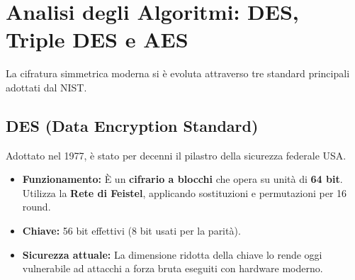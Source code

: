 \begin{figure}[h]
\end{figure}

\newpage

\section{Analisi degli Algoritmi: DES, Triple DES e AES}
La cifratura simmetrica moderna si è evoluta attraverso tre standard principali adottati dal NIST.

\subsection{DES (Data Encryption Standard)}
Adottato nel 1977, è stato per decenni il pilastro della sicurezza federale USA.
\begin{itemize}
    \item \textbf{Funzionamento:} È un \textbf{cifrario a blocchi} che opera su unità di \textbf{64 bit}. Utilizza la \textbf{Rete di Feistel}, applicando sostituzioni e permutazioni per 16 round.
    \item \textbf{Chiave:} 56 bit effettivi (8 bit usati per la parità).
    \item \textbf{Sicurezza attuale:} La dimensione ridotta della chiave lo rende oggi vulnerabile ad attacchi a forza bruta eseguiti con hardware moderno.
\end{itemize}

